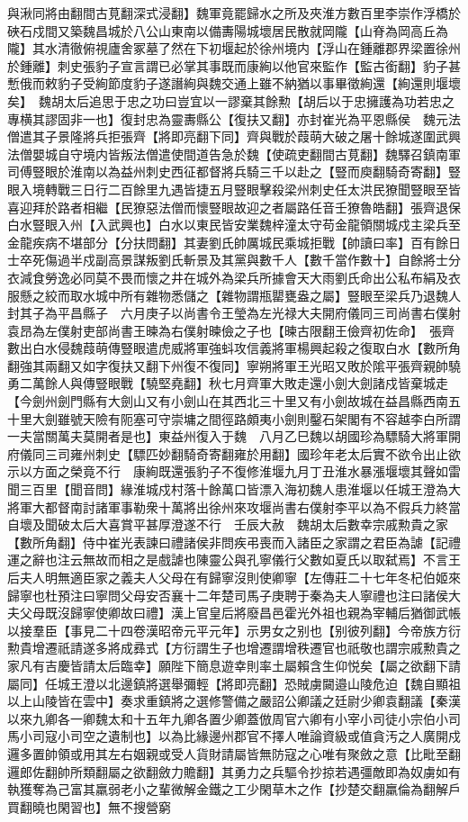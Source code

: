 與湫同將由翻間古莧翻深式浸翻】魏軍竟罷歸水之所及夾淮方數百里李崇作浮橋於硤石戍間又築魏昌城於八公山東南以備夀陽城壞居民散就岡隴【山脊為岡高丘為隴】其水清徹俯視廬舍冢墓了然在下初堰起於徐州境内【浮山在鍾離郡界梁置徐州於鍾離】刺史張豹子宣言謂已必掌其事既而康絢以他官來監作【監古銜翻】豹子甚慙俄而敕豹子受絢節度豹子遂譖絢與魏交通上雖不納猶以事畢徵絢還【絢還則堰壞矣】　魏胡太后追思于忠之功曰豈宜以一謬棄其餘勲【胡后以于忠擁護為功若忠之專横其謬固非一也】復封忠為靈夀縣公【復扶又翻】亦封崔光為平恩縣侯　魏元法僧遣其子景隆將兵拒張齊【將即亮翻下同】齊與戰於葭萌大破之屠十餘城遂圍武興法僧嬰城自守境内皆叛法僧遣使間道告急於魏【使疏吏翻間古莧翻】魏驛召鎮南軍司傅豎眼於淮南以為益州刺史西征都督將兵騎三千以赴之【豎而庾翻騎奇寄翻】豎眼入境轉戰三日行二百餘里九遇皆捷五月豎眼擊殺梁州刺史任太洪民獠聞豎眼至皆喜迎拜於路者相繼【民獠惡法僧而懷豎眼故迎之者屬路任音壬獠魯皓翻】張齊退保白水豎眼入州【入武興也】白水以東民皆安業魏梓潼太守苟金龍領關城戍主梁兵至金龍疾病不堪部分【分扶問翻】其妻劉氏帥厲城民乘城拒戰【帥讀曰率】百有餘日士卒死傷過半戍副高景謀叛劉氏斬景及其黨與數千人【數千當作數十】自餘將士分衣減食勞逸必同莫不畏而懷之井在城外為梁兵所據會天大雨劉氏命出公私布絹及衣服懸之絞而取水城中所有雜物悉儲之【雜物謂瓶罌甕盎之屬】豎眼至梁兵乃退魏人封其子為平昌縣子　六月庚子以尚書令王瑩為左光禄大夫開府儀同三司尚書右僕射袁昂為左僕射吏部尚書王暕為右僕射暕儉之子也【暕古限翻王儉齊初佐命】　張齊數出白水侵魏葭萌傳豎眼遣虎威將軍強蚪攻信義將軍楊興起殺之復取白水【數所角翻強其兩翻又如字復扶又翻下州復不復同】寧朔將軍王光昭又敗於隂平張齊親帥驍勇二萬餘人與傳豎眼戰【驍堅堯翻】秋七月齊軍大敗走還小劍大劍諸戍皆棄城走【今劍州劍門縣有大劍山又有小劍山在其西北三十里又有小劍故城在益昌縣西南五十里大劍雖號天險有阨塞可守崇墉之間徑路頗夷小劍則鑿石架閣有不容越李白所謂一夫當關萬夫莫開者是也】東益州復入于魏　八月乙巳魏以胡國珍為驃騎大將軍開府儀同三司雍州刺史【驃匹妙翻騎奇寄翻雍於用翻】國珍年老太后實不欲令出止欲示以方面之榮竟不行　康絢既還張豹子不復修淮堰九月丁丑淮水暴漲堰壞其聲如雷聞三百里【聞音問】緣淮城戍村落十餘萬口皆漂入海初魏人患淮堰以任城王澄為大將軍大都督南討諸軍事勒衆十萬將出徐州來攻堰尚書右僕射李平以為不假兵力終當自壞及聞破太后大喜賞平甚厚澄遂不行　壬辰大赦　魏胡太后數幸宗戚勲貴之家【數所角翻】侍中崔光表諫曰禮諸侯非問疾弔喪而入諸臣之家謂之君臣為謔【記禮運之辭也注云無故而相之是戲謔也陳靈公與孔寧儀行父數如夏氏以取弑焉】不言王后夫人明無適臣家之義夫人父母在有歸寧沒則使卿寧【左傳莊二十七年冬杞伯姬來歸寧也杜預注曰寧問父母安否襄十二年楚司馬子庚聘于秦為夫人寧禮也注曰諸侯大夫父母既沒歸寧使卿故曰禮】漢上官皇后將廢昌邑霍光外祖也親為宰輔后猶御武帳以接羣臣【事見二十四卷漢昭帝元平元年】示男女之别也【别彼列翻】今帝族方衍勲貴增遷祇請遂多將成彞式【方衍謂生子也增遷謂增秩遷官也祇敬也謂宗戚勲貴之家凡有吉慶皆請太后臨幸】願陛下簡息遊幸則率土屬賴含生仰悦矣【屬之欲翻下請屬同】任城王澄以北邊鎮將選舉彌輕【將即亮翻】恐賊虜闚邉山陵危迫【魏自顯祖以上山陵皆在雲中】奏求重鎮將之選修警備之嚴詔公卿議之廷尉少卿袁翻議【秦漢以來九卿各一卿魏太和十五年九卿各置少卿蓋倣周官六卿有小宰小司徒小宗伯小司馬小司寇小司空之遺制也】以為比緣邊州郡官不擇人唯論資級或值貪汚之人廣開戍邏多置帥領或用其左右姻親或受人貨財請屬皆無防寇之心唯有聚斂之意【比毗至翻邏郎佐翻帥所類翻屬之欲翻斂力贍翻】其勇力之兵驅令抄掠若遇彊敵即為奴虜如有執獲奪為己富其羸弱老小之輩微解金鐵之工少閑草木之作【抄楚交翻羸倫為翻解戶買翻曉也閑習也】無不搜營窮